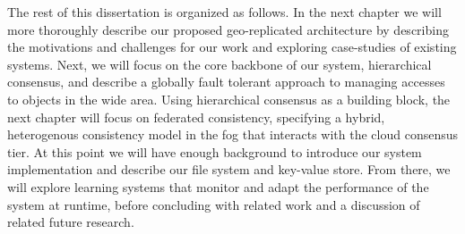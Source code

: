 The rest of this dissertation is organized as follows.
In the next chapter we will more thoroughly describe our proposed geo-replicated architecture by describing the motivations and challenges for our work and exploring case-studies of existing systems.
Next, we will focus on the core backbone of our system, hierarchical consensus, and describe a globally fault tolerant approach to managing accesses to objects in the wide area.
Using hierarchical consensus as a building block, the next chapter will focus on federated consistency, specifying a hybrid, heterogenous consistency model in the fog that interacts with the cloud consensus tier.
At this point we will have enough background to introduce our system implementation and describe our file system and key-value store.
From there, we will explore learning systems that monitor and adapt the performance of the system at runtime, before concluding with related work and a discussion of related future research.
